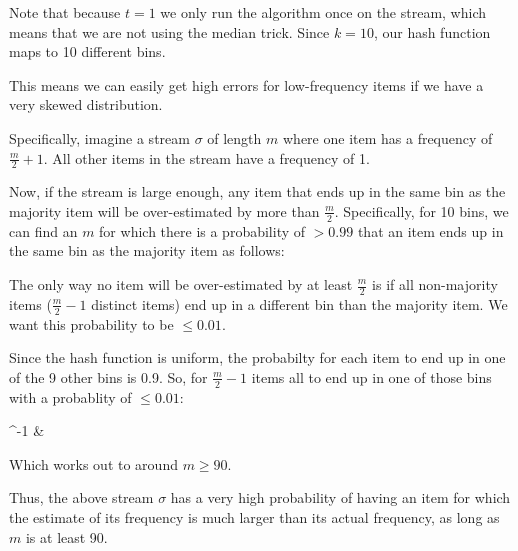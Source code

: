 Note that because $t = 1$ we only run the algorithm once on the stream, which means that we are not using the median trick.
Since $k = 10$, our hash function maps to 10 different bins.

This means we can easily get high errors for low-frequency items if we have a very skewed distribution.

Specifically, imagine a stream $\sigma$ of length $m$ where one item has a frequency of $\frac{m}{2} + 1$.
All other items in the stream have a frequency of 1.

Now, if the stream is large enough, any item that ends up in the same bin as the majority item will be over-estimated by more than $\frac{m}{2}$.
Specifically, for 10 bins, we can find an $m$ for which there is a probability of $> 0.99$ that an item ends up in the same bin as the majority item as follows:

The only way no item will be over-estimated by at least $\frac{m}{2}$ is if all non-majority items ($\frac{m}{2} - 1$ distinct items) end up in a different bin than the majority item.
We want this probability to be $\leq 0.01$.

Since the hash function is uniform, the probabilty for each item to end up in one of the 9 other bins is 0.9.
So, for $\frac{m}{2} - 1$ items all to end up in one of those bins with a probablity of $\leq 0.01$:

^{-1} &\\
\]

Which works out to around $m \geq 90$.

Thus, the above stream $\sigma$ has a very high probability of having an item for which the estimate of its frequency is much larger than its actual frequency, as long as $m$ is at least 90.
